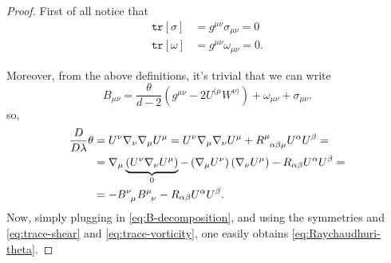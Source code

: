 	\begin{proof}
		First of all notice that 
		\begin{align}
			\label{eq:trace-shear}
			\texttt{tr}[\sigma] &= g^{\mu\nu}\sigma_{\mu\nu} = 0\\
			\label{eq:trace-vorticity}
			\texttt{tr}[\omega] &= g^{\mu\nu}\omega_{\mu\nu} = 0.
		\end{align}
		
		Moreover, from the above definitions, it's trivial that we can write
		\begin{equation}
		\label{eq:B-decomposition}
			B_{\mu\nu} = \frac{\theta}{d - 2} \left(g^{\mu\nu} - 2U^{(\mu}W^{\nu)}\right) +\omega_{\mu\nu} + \sigma_{\mu\nu}.
		\end{equation}
		so,
		\begin{align*}
			\frac{D}{D\lambda}\theta &= U^{\nu}\nabla_{\nu}\nabla_{\mu}U^{\mu} = U^{\nu}\nabla_{\mu}\nabla_{\nu}U^{\mu} + R\indices{^{\mu}_{\alpha\beta\mu}}U^{\alpha}U^{\beta} =\\
			&= \nabla_{\mu}\underbrace{\left(U^{\nu}\nabla_{\nu}U^{\mu}\right)}_{0} - \left(\nabla_{\mu}U^{\nu}\right)\left(\nabla_{\nu}U^{\mu}\right) - R_{\alpha\beta}U^{\alpha}U^{\beta} =\\
			&= - B\indices{^{\nu}_{\mu}}B\indices{^{\mu}_{\nu}} - R_{\alpha\beta}U^{\alpha}U^{\beta}.
		\end{align*}
		Now, simply plugging in \eqref{eq:B-decomposition}, and using the symmetries and \eqref{eq:trace-shear} and \eqref{eq:trace-vorticity}, one easily obtains \eqref{eq:Raychaudhuri-theta}.
		

\end{proof}
